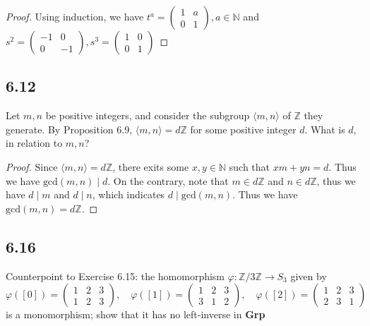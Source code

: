 \documentclass[a4paper, pdf, 12pt]{article}
\begin{document}
\begin{proof}
  Using induction, we have
  $t^{a} = \begin{pmatrix}
      1 & a \\
      0 & 1
    \end{pmatrix}, a\in \mathbb{N}$ and
  $
    s^{2} = \begin{pmatrix}
      -1 & 0  \\
      0  & -1
    \end{pmatrix},
    s^{3} = \begin{pmatrix}
      1 & 0 \\
      0 & 1
    \end{pmatrix}
  $
\end{proof}

\subsection*{6.12}
Let $m, n$ be positive integers, and consider the subgroup $\langle m, n\rangle$ of $\mathbb{Z}$
they generate. By Proposition 6.9,
$\langle m, n\rangle = d\mathbb{Z}$
for some positive integer $d$. What is $d$, in relation to $m, n$?

\begin{proof}
  Since $\langle m, n\rangle = d\mathbb{Z}$, there exits some $x, y\in \mathbb{N}$ such that
  $xm + yn = d$. Thus we have $\mbox{gcd}(m, n) \mid d$. On the contrary, note that $m\in d\mathbb{Z}$ and
  $n\in d\mathbb{Z}$, thus we have $d\mid m$ and $d\mid n$, which indicates $d\mid \mbox{gcd}(m, n)$. Thus
  we have $\mbox{gcd}(m, n) = d\mathbb{Z}$.
\end{proof}

\subsection*{6.16}
Counterpoint to Exercise 6.15: the homomorphism $\varphi: \mathbb{Z}/3\mathbb{Z} \rightarrow S_{3}$ given
by
$$
  \varphi([0]) = \begin{pmatrix}
    1 & 2 & 3 \\
    1 & 2 & 3
  \end{pmatrix},\quad
  \varphi([1]) = \begin{pmatrix}
    1 & 2 & 3 \\
    3 & 1 & 2
  \end{pmatrix},\quad
  \varphi([2]) = \begin{pmatrix}
    1 & 2 & 3 \\
    2 & 3 & 1
  \end{pmatrix}
$$
is a monomorphism; show that it has no left-inverse in \textbf{Grp}
\end{document}
